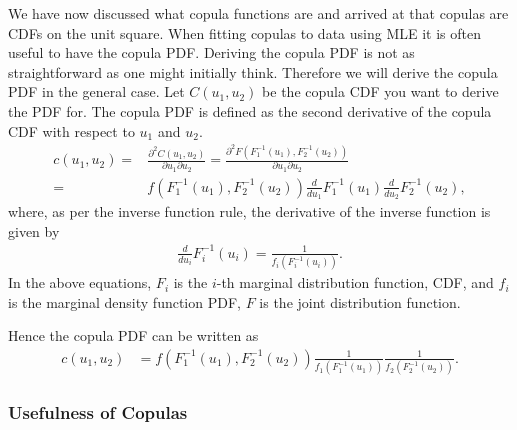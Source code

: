 We have now discussed what copula functions are and arrived at that copulas are \gls{CDF}s on the unit square. When fitting copulas to data using \gls{MLE} it is often useful to have the copula \gls{PDF}. Deriving the copula \gls{PDF} is not as straightforward as one might initially think. Therefore we will derive the copula \gls{PDF} in the general case. Let $C(u_1,u_2)$ be the copula \gls{CDF} you want to derive the \gls{PDF} for. The copula \gls{PDF} is defined as the second derivative of the copula \gls{CDF} with respect to $u_1$ and $u_2$.
\begin{align*}
    c(u_1,u_2) =& \frac{\partial^2C(u_1,u_2)}{\partial u_1\partial u_2} = 
    \frac{\partial^2F(F_1^{-1}(u_1),F_2^{-1}(u_2))}{\partial u_1\partial u_2}\\
    =&  f(F_1^{-1}(u_1),F_2^{-1}(u_2)) \frac{d}{du_1} F_1^{-1}(u_1)  \frac{d}{du_2} F_2^{-1}(u_2),
\end{align*}
where, as per the inverse function rule, the derivative of the inverse function is given by
\begin{align*}
    \frac{d}{du_i} F_i^{-1}(u_i) = \frac{1}{f_i(F_i^{-1}(u_i))}.
\end{align*}
In the above equations, $F_i$ is the $i$-th marginal distribution function, \gls{CDF}, and $f_i$ is the marginal density function \gls{PDF}, $F$ is the joint distribution function.   

Hence the copula \gls{PDF} can be written as 
\begin{align*}
    c(u_1,u_2) &= f(F_1^{-1}(u_1),F_2^{-1}(u_2)) \frac{1}{f_1(F_1^{-1}(u_1))}\frac{1}{f_2(F_2^{-1}(u_2))}. 
\end{align*}




\subsubsection{Usefulness of Copulas}\label{sec:NeedForCopulas}

